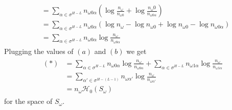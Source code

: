 \begin{Proof}
\begin{align}
\begin{aligned}
      &= \sum\limits_{\alpha \in \sigma^{H - L}} n_{\omega 0\alpha} \left(\log\frac{n_\omega}{n_{\omega 0}} + \log\frac{n_\omega 0}{n_{\omega 0\alpha}}\right) \\
      &= \sum\limits_{\alpha \in \sigma^{H - L}} n_{\omega 0\alpha} \left(\log n_\omega - \log n_{\omega 0} + \log n_{\omega 0} - \log n_{\omega 0\alpha}\right) \\
      &= \sum\limits_{\alpha \in \sigma^{H - L}} n_{\omega 0\alpha} \log\frac{n_\omega}{n_{\omega 0\alpha}}
    \end{aligned}
  \end{align}
  Plugging the values of $(a)$ and $(b)$ we get
  \begin{align}
    \begin{aligned}
      (*)
      &= \sum\limits_{\alpha \in \sigma^{H - L}} n_{\omega 0\alpha} \log\frac{n_\omega}{n_{\omega 0\alpha}} + \sum\limits_{\alpha \in \sigma^{H - L}} n_{\omega 1\alpha} \log\frac{n_\omega}{n_{\omega 1\alpha}} \\
      &= \sum\limits_{\alpha' \in \sigma^{H - (L - 1)}} n_{\omega\alpha'} \log\frac{n_\omega}{n_{\omega\alpha'}} \\
      &= n_\omega\mathcal{H}_0(S_\omega)
    \end{aligned}
  \end{align}
  for the space of $S_\omega$.
\end{Proof}
